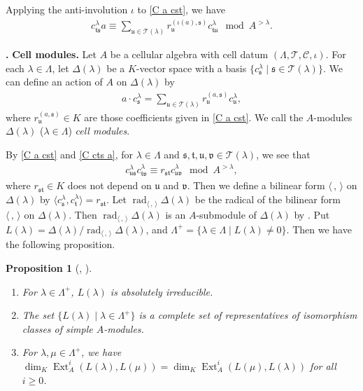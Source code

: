 \documentclass[12pt]{amsart}
\newtheorem{prop}[thm]{Proposition}
\def \para{\refstepcounter{thm} \par\medskip\noindent
                \textbf{\thethm .} }
\numberwithin{equation}{thm}
\newcommand\cC{\mathcal{C}}
\newcommand\cT{\mathcal{T}}
\newcommand\fs{\mathfrak s}
\newcommand\ft{\mathfrak t}
\newcommand\fu{\mathfrak u}
\newcommand\fv{\mathfrak v}
\newcommand\la{\lambda}
\newcommand\D{\Delta}
\newcommand\vL{\varLambda}
\newcommand\lan{\langle}
\newcommand\ran{\rangle}
\newcommand\Ext{\operatorname{Ext}}
\newcommand\rad{\operatorname{rad}}
\begin{document}
Applying the anti-involution $\iota$ to \eqref{C a cst}, we have 
\begin{align}
\label{C cts a} 
c_{\ft \fs}^{\la} a \equiv \sum_{\fu \in \cT(\la)} r_{\fu}^{(\iota(a), \fs)} c_{\ft \fu}^{\la} \mod A^{>\la}.
\end{align}

\para {\bf Cell modules.} 
Let $A$ be a cellular algebra with cell datum $(\vL, \cT, \cC, \iota)$. 
For each $\la \in \vL$,  
let $\D(\la)$ be a $K$-vector space with a basis $\{c_{\fs}^{\la} \mid \fs \in \cT(\la)\}$. 
We can define an action of $A$ on $\D(\la)$ by 
\begin{align*}
a \cdot c_{\fs}^{\la} = \sum_{\fu \in \cT(\la)} r_{\fu}^{(a, \fs)} c_{\fu}^{\la}, 
\end{align*}
where $r_{\fu}^{(a, \fs)} \in K$ are those coefficients given in \eqref{C a cst}. 
We call the $A$-modules $\D(\la)$ ($\la \in \vL$) \emph{cell modules}. 

By \eqref{C a cst} and \eqref{C cts a}, 
for $\la \in \vL$ and $\fs, \ft, \fu, \fv \in \cT(\la)$, 
we see that  
\begin{align*}
c_{\fu \fs}^{\la} c_{\ft \fv}^{\la} \equiv r_{\fs \ft} c_{\fu \fv}^{\la} \mod A^{> \la}, 
\end{align*}
where $r_{\fs \ft}\in K $ does not depend on $\fu$ and $\fv$. 
Then we define a bilinear form $\lan \, , \, \ran$ on $\D(\la)$ by $\lan c_{\fs}^{\la}, c_{\ft}^{\la} \ran = r_{\fs \ft}$.
Let $\rad_{\lan \,,\,\ran} \D(\la)$ be the radical of the bilinear form $\lan \,,\, \ran$ on $\D(\la)$. 
Then $\rad_{\lan \,,\, \ran} \D(\la)$ is an $A$-submodule of $\D(\la)$ by \cite[Proposition 3.2]{GL}. 
Put $L(\la) = \D(\la) / \rad_{\lan \,,\, \ran} \D(\la)$, 
and $ \vL^+ = \{\la \in \vL \mid L(\la) \not=0\}$. 
Then we have the following proposition. 


\begin{prop}[{\cite[Proposition 3.2, Theorem 3.4]{GL}, \cite[Lemma 2.5]{C}}]\ 
\label{C Prop simple}
\begin{enumerate}
\item 
For $\la \in \vL^+$, $L(\la)$ is absolutely irreducible. 

\item 
The set $\{L(\la) \mid \la \in \vL^+\}$ is a complete set of representatives of isomorphism classes of simple $A$-modules. 

\item 
For $\la, \mu \in \vL^+$, we have 
$\dim_K \Ext_{A}^i (L(\la), L(\mu)) = \dim_K \Ext_{A}^i (L(\mu), L(\la))$ for all $i \geq 0$. 

\end{enumerate}
\end{prop}
\end{document}
